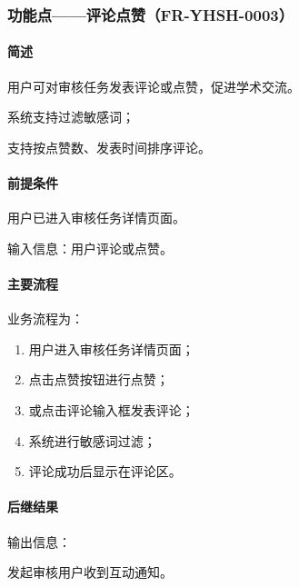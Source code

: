 {\color{black}
\subsubsection{功能点——评论点赞（FR-YHSH-0003）}

\paragraph*{简述}

用户可对审核任务发表评论或点赞，促进学术交流。

系统支持过滤敏感词；

支持按点赞数、发表时间排序评论。

\paragraph*{前提条件}

用户已进入审核任务详情页面。

输入信息：用户评论或点赞。

\paragraph*{主要流程}

业务流程为：

\begin{enumerate}
    \item 用户进入审核任务详情页面；
    \item 点击点赞按钮进行点赞；
    \item 或点击评论输入框发表评论；
    \item 系统进行敏感词过滤；
    \item 评论成功后显示在评论区。
\end{enumerate}

\paragraph*{后继结果}

输出信息：

发起审核用户收到互动通知。
}


